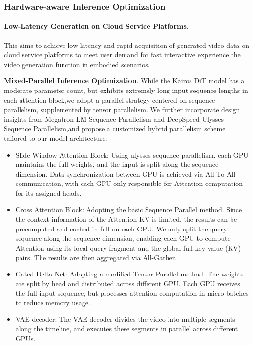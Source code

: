 \subsubsection{Hardware-aware Inference Optimization}

\paragraph{Low-Latency Generation on Cloud Service Platforms.}
 This aims to achieve low-latency and rapid acquisition of generated video data on cloud service platforms to meet user demand for fast interactive experience the video generation function in embodied scenarios.

\textbf {Mixed-Parallel Inference Optimization}. While the Kairos DiT model has a moderate parameter count, but exhibits extremely long input sequence lengths in each attention block,we adopt a parallel strategy centered on sequence parallelism, supplemented by tensor parallelism. We further incorporate design insights from Megatron-LM Sequence Parallelism and DeepSpeed-Ulysses Sequence Parallelism,and propose a customized hybrid parallelism scheme tailored to our model architecture.


\begin{itemize}
    \item Slide Window Attention Block: Using ulysses sequence parallelism, each GPU maintains the full weights, and the input is split along the sequence dimension. Data synchronization between GPU is achieved via All-To-All communication, with each GPU only responsible for Attention computation for its assigned heads.
    
    \item Cross Attention Block: Adopting the basic Sequence Parallel method. Since the context information of the Attention KV is limited, the results can be precomputed and cached in full on each GPU. We only split the query sequence along the sequence dimension, enabling each GPU to compute Attention using its local query fragment and the global full key-value (KV) pairs. The results are then aggregated via All-Gather.
    
    \item Gated Delta Net: Adopting a modified Tensor Parallel method. The weights are split by head and distributed across different GPU. Each GPU receives the full input sequence, but processes attention computation in micro-batches to reduce memory usage.

    \item VAE decoder: The VAE decoder divides the video into multiple segments along the timeline, and executes these segments in parallel across different GPUs.
    
\end{itemize}

